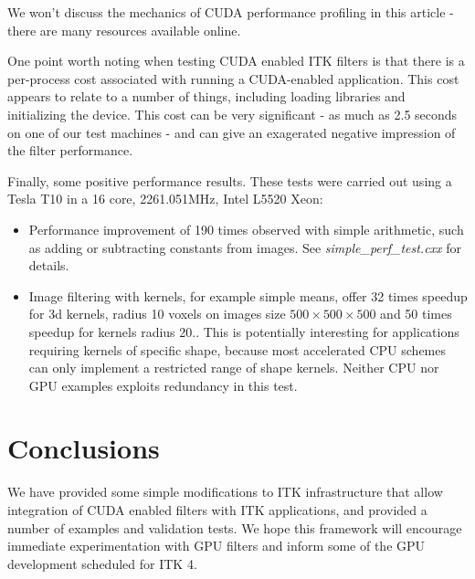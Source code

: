 \documentclass{InsightArticle}
\begin{document}
We won't discuss the mechanics of CUDA performance profiling in this
article - there are many resources available online.

One point worth noting when testing CUDA enabled ITK filters is that
there is a per-process cost associated with running a CUDA-enabled
application. This cost appears to relate to a number of things,
including loading libraries and initializing the device. This cost can
be very significant - as much as 2.5 seconds on one of our test
machines - and can give an exagerated negative impression of the  filter
performance. 

Finally, some positive performance results. These tests were carried
out using a Tesla T10 in a 16 core, 2261.051MHz, Intel L5520  Xeon:
\begin{itemize}
\item Performance improvement of 190 times observed with simple arithmetic, such as adding or subtracting constants from
  images. See {\em simple\_perf\_test.cxx} for details.
\item Image filtering with kernels, for example simple means, offer 32
  times speedup for 3d kernels, radius 10 voxels on images size $500
  \times 500 \times 500$ and 50 times speedup for kernels radius
  20.. This is potentially interesting for applications requiring
  kernels of specific shape, because most accelerated CPU schemes can
  only implement a restricted range of shape kernels. Neither CPU nor
  GPU examples exploits redundancy in this test.
\end{itemize}


\section{Conclusions}
We have provided some simple modifications to ITK infrastructure that
allow integration of CUDA enabled filters with ITK applications, and
provided a number of examples and validation tests. We hope this
framework will encourage immediate experimentation with GPU filters
and inform some of the GPU development scheduled for ITK 4.


%

\nocite{ITKSoftwareGuide}
\end{document}
